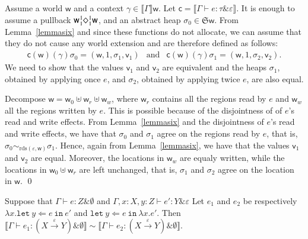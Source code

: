 \documentclass[orivec]{llncs}
\newcommand{\keywd}[1]{\mathtt{#1}}
\newcommand{\sq}[4]{\tensor*[^{#1}_{#2}]{\Diamond}{^{#3}_{#4}}}
\newcommand{\effto}[1]{\stackrel{#1}{\to}}
\newcommand{\letin}[2]{\keywd{let}\:{#1}\!\Leftarrow\!{#2}\:\keywd{in}\:}
\newcommand{\rdsin}[1]{\mathrm{rds}({#1})}
\newcommand{\eff}{\varepsilon}
\newcommand{\sem}[1]{\ensuremath{\llbracket {#1} \rrbracket}}
\renewenvironment{proof}{\vspace{-1mm} \noindent {\bf Proof}\quad}{\qed}
\newcommand\w{\ensuremath{\mathsf{w}}\xspace}
\newcommand{\Astores}{\mathfrak{S}}
\newcommand\val{\ensuremath{\mathsf{v}}\xspace}
\newcommand\cval{\ensuremath{\mathsf{c}}\xspace}
\newcommand{\ety}[2]{{#1}\mathrel{\&}{#2}}
\newcommand{\valty}[1]{#1}
\begin{document}
\begin{proof}
Assume a world \w and a context $\gamma \in \sem{\Gamma}\w$.
Let $\cval = \sem{\Gamma \vdash e : \ety{\tau}{\eff}}$. 
It is enough to assume a pullback 
$\w \sq{1}{1}{1}{1} \w$, and an abstract heap $\sigma_0 \in
\Astores \w$. 
From Lemma~\ref{lemmasix} and since these functions do not allocate, we
can assume that they do not cause any world extension and are therefore
defined as follows:
\[
 \begin{array}{lcl}
 \cval(\w)(\gamma)\sigma_0  =  (\w, 1, \sigma_1, \val_1) &
\textrm{and}&
  \cval(\w)(\gamma)\sigma_1  =  (\w, 1, \sigma_2, \val_2).
 \end{array}
\]
We need to show that the values $\val_1$ and $\val_2$ are equivalent and 
the heaps $\sigma_1$, obtained by applying once $e$, and $\sigma_2$,
obtained by applying twice $e$, are also equal. 

Decompose $\w = \w_0 \uplus \w_r \uplus \w_w $, where $\w_r$ contains all
the regions read by $e$ and $\w_w$ all the regions written by $e$. This is
possible because of the disjointness of of $e$'s read and write effects. 
From Lemma~\ref{lemmasix} and the disjointness of  $e$'s read and write
effects, we have that $\sigma_0$ and $\sigma_1$ agree on the regions read
by $e$, that is, $\sigma_0 \sim_{\rdsin{\eff, \w}} \sigma_1$. Hence, again
from Lemma~\ref{lemmasix}, we have that the values $\val_1$ and $\val_2$
are equal. Moreover, the locations in $\w_w$ are equaly written, while the
locations in $\w_0 \uplus \w_r$ are left unchanged, that is,
$\sigma_1$ and $\sigma_2$ agree on the location in $\w$.
\end{proof}

\begin{proposition}\label{hoist}
Suppose that $
\Gamma\vdash e: \ety{Z}{\emptyset}$ and 
$\Gamma,x{:}X,y{:}Z\vdash e': \ety{Y}{\eff}$
Let $e_1$ and $e_2$ be respectively $
\lambda x.\letin{y}{e} {e'}$ and
$\letin{y}{e}{\lambda x.e'}$. 
Then $\sem{\Gamma\vdash  e_1 :
\ety{(\valty{X\effto\eff
Y})}{\emptyset}} \sim 
\sem{\Gamma\vdash  e_2 : \ety{(\valty{X\effto\eff
Y})}{\emptyset}}$.
\end{proposition}
\end{document}
